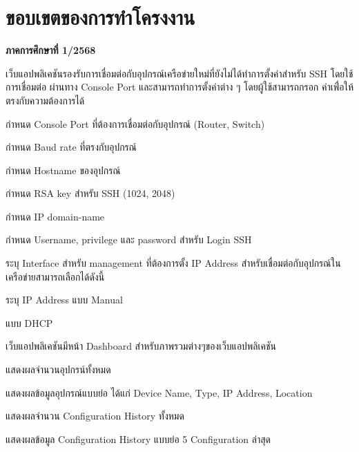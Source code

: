 \section{ขอบเขตของการทําโครงงาน} \label{sec1:scope}
\hspace*{1 cm}\textbf{ภาคการศึกษาที่ 1/2568}
\begin{mycustomenum2}
    \item เว็บแอปพลิเคชันรองรับการเชื่อมต่อกับอุปกรณ์เครือข่ายใหม่ที่ยังไม่ได้ทำการตั้งค่าสำหรับ 
SSH โดยใช้การเชื่อมต่อ ผ่านทาง Console Port และสามารถทำการตั้งค่าต่าง ๆ โดยผู้ใช้สามารถกรอก
 ค่าเพื่่อให้ตรงกับความต้องการได้ 
    \begin{mycustomenum2}
        \item กำหนด Console Port ที่ต้องการเชื่อมต่อกับอุปกรณ์ (Router, Switch)
        \item กำหนด Baud rate ที่ตรงกับอุปกรณ์ 
        \item กำหนด Hostname ของอุปกรณ์ 
        \item กำหนด RSA key สำหรับ SSH (1024, 2048) 
        \item กำหนด IP domain-name 
        \item กำหนด Username, privilege และ password สำหรับ Login SSH 
        \item ระบุ Interface สำหรับ management ที่ต้องการตั้ง IP Address สำหรับเชื่อมต่อกับอุปกรณ์ในเครือข่ายสามารถเลือกได้ดังนี้
            \begin{mycustomenum2}
                \item ระบุ IP Address แบบ Manual
                \item แบบ DHCP 
            \end{mycustomenum2}
    \end{mycustomenum2}

    \item เว็บแอปพลิเคชันมีหน้า Dashboard สำหรับภาพรวมต่างๆของเว็บแอปพลิเคชัน 
    \begin{mycustomenum2}
        \item แสดงผลจำนวนอุปกรน์ทั้งหมด 
        \item แสดงผลข้อมูลอุปกรณ์แบบย่อ ได้แก่ Device Name, Type, IP Address, Location
        \item แสดงผลจำนวน Configuration History ทั้งหมด
        \item แสดงผลข้อมูล Configuration History แบบย่อ 5 Configuration ล่าสุด 
    \end{mycustomenum2}


\end{mycustomenum2}
